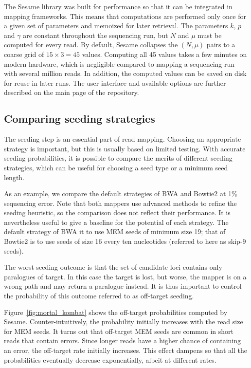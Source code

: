 \documentclass[a4,center,fleqn]{NAR}
\begin{document}
The Sesame library was built for performance so that it can be integrated
in mapping frameworks. This means that computations are performed only
once for a given set of parameters and memoized for later retrieval. The
parameters $k$, $p$ and $\gamma$ are constant throughout the sequencing
run, but $N$ and $\mu$ must be computed for every read. By default, Sesame
collapses the $(N, \mu)$ pairs to a coarse grid of $15 \times 3=45$
values. Computing all 45 values takes a few minutes on modern hardware,
which is negligible compared to mapping a sequencing run with several
million reads. In addition, the computed values can be saved on disk for
reuse in later runs. The user interface and available options are further
described on the main page of the repository.


\subsection{Comparing seeding strategies}

The seeding step is an essential part of read mapping. Choosing an
appropriate strategy is important, but this is usually based on limited
testing. With accurate seeding probabilities, it is possible to compare
the merits of different seeding strategies, which can be useful for
choosing a seed type or a minimum seed length.

As an example, we compare the default strategies of BWA and Bowtie2 at 1\%
sequencing error. Note that both mappers use advanced methods to refine
the seeding heuristic, so the comparison does not reflect their
performance. It is nevertheless useful to give a baseline for the
potential of each strategy. The default strategy of BWA it to use MEM
seeds of minimum size 19; that of Bowtie2 is to use seeds of size 16 every
ten nucleotides (referred to here as skip-9 seeds).

The worst seeding outcome is that the set of candidate loci contains only
paralogues of target. In this case the target is lost, but worse, the
mapper is on a wrong path and may return a paralogue instead. It is thus
important to control the probability of this outcome referred to as
off-target seeding.

Figure~\ref{fig:mortal_kombat} shows the off-target probabilities computed
by Sesame. Counter-intuitively, the probability initially increases with
the read size for MEM seeds. It turns out that off-target MEM seeds are
common in short reads that contain errors. Since longer reads have a
higher chance of containing an error, the off-target rate initially
increases. This effect dampens so that all the probabilities eventually
decrease exponentially, albeit at different rates.
\end{document}
